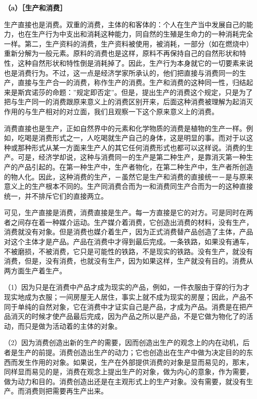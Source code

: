 \documentclass[a4paper,twoside,12pt]{ctexart}
\begin{document}
\textbf{（a）［生产和消费］}

生产直接也是消费。双重的消费，主体的和客体的：个人在生产当中发展自己的能力，也在生产行为中支出和消耗这种能力，同自然的生殖是生命力的一种消耗完全一样。第二，生产资料的消费，生产资料被使用，被消耗，一部分（如在燃烧中）重新分解为一般元素。原料的消费也是这样，原料不再保持自己的自然形状和特性，这种自然形状和特性倒是消耗掉了。因此，生产行为本身就它的一切要素来说也是消费行为。不过，这一点是经济学家所承认的，他们把直接与消费同一的生产，直接与生产合一的消费，称作生产的消费。生产和消费的这种同一性，归结起来是斯宾诺莎的命题：”规定即否定”。但是，提出生产的消费这个规定，只是为了把与生产同一的消费跟原来意义上的消费区别开来，后面这种消费被理解为起消灭作用的与生产相对的对立面，我们且观察一下这个原来意义上的消费。

消费直接也是生产，正如自然界中的元素和化学物质的消费是植物的生产一样。例如，吃喝是消费形式之一，人吃喝就生产自己的身体，这是明显的事。而对于以这种或那种形式从某一方面来生产人的其它任何消费形式也都可以这样说。消费的生产。可是，经济学却说，这种与消费同一的生产是第二种生产，是靠消灭第一种生产的产品引起的。在第一种生产中，生产者物化，在第二种生产中，生产者所创造的物人化。因此，这种消费的生产，－虽然它是生产和消费的直接统一－是与原来意义上的生产根本不同的。生产同消费合而为一和消费同生产合而为一的这种直接统一，并不排斥它们的直接两立。

可见，生产直接是消费，消费直接是生产。每一方直接是它的对方。可是同时在两者之间存在着一种媒介运动。生产媒介着消费，它创造出消费的材料，没有生产，消费就没有对象。但是消费也媒介着生产，因为正式消费替产品创造了主体，产品对这个主体才是产品。产品在消费中才得到最后完成。一条铁路，如果没有通车，不被磨损，不被消费，它只是可能性的铁路，不是现实的铁路。没有生产，就没有消费，但是，没有消费，也就没有生产，因为如果这样，生产就没有目的。消费从两方面生产着生产。

（1）因为只是在消费中产品才成为现实的产品，例如，一件衣服由于穿的行为才现实地成为衣服；一间房屋无人居住，事实上就不成为现实的房屋；因此，产品不同于单纯的自然对象，它在消费中才证实自己是产品，才成为产品。消费是在把产品消灭的时候才使产品最后完成，因为产品之所以是产品，不是它做为物化了的活动，而只是做为活动着的主体的对象。

（2）因为消费创造出新的生产的需要，因而创造出生产的观念上的内在动机，后者是生产的前提。消费创造出生产的动力；它也创造出在生产中做为决定目的的东西而发生作用的对象。如果说，生产在外部提供消费的对象是显而易见的，那末，同样显而易见的是，消费在观念上提出生产的对象，做为内心的意象，作为需要，做为动力和目的。消费创造出还是在主观形式上的生产对象。没有需要，就没有生产。而消费则把需要再生产出来。
\end{document}
